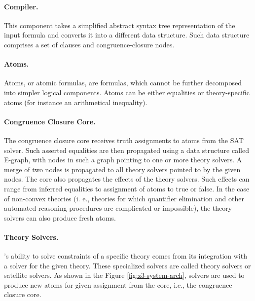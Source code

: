 \paragraph{Compiler.}
This component takes a simplified abstract syntax tree representation of the input formula and converts it into a different data structure.
Such data structure comprises a set of clauses and congruence-closure nodes.

\paragraph{Atoms.}
Atoms, or atomic formulas, are formulas, which cannot be further decomposed into simpler logical components.
Atoms can be either equalities or theory-specific atoms (for instance an arithmetical inequality).

\paragraph{Congruence Closure Core.}
The congruence closure core receives truth assignments to atoms from the SAT solver.
Such asserted equalities are then propagated using a data structure called E-graph, with nodes in such a graph pointing to one or more theory solvers.
A merge of two nodes is propagated to all theory solvers pointed to by the given nodes.
The core also propagates the effects of the theory solvers.
Such effects can range from inferred equalities to assignment of atoms to true or false.
In the case of non-convex theories (i. e., theories for which quantifier elimination and other automated reasoning procedures are complicated or impossible), the theory solvers can also produce fresh atoms.

\paragraph{Theory Solvers.}
\ziii’s ability to solve constraints of a specific theory comes from its integration with a solver for the given theory.
These specialized solvers are called theory solvers or satellite solvers.
As shown in the Figure \ref{fig:z3-system-arch}, solvers are used to produce new atoms for given assignment from the \ziii core, i.e., the congruence closure core.

